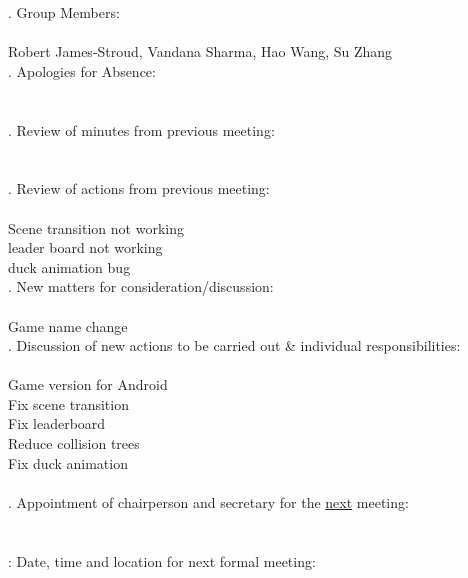 \documentclass{article}
\begin{document}
. Group Members: \\\\ \indent Robert James-Stroud, Vandana Sharma, Hao Wang, Su Zhang \\

. Apologies for Absence: \\\\ \indent   \\

. Review of minutes from previous meeting: \\\\ \indent  \\

. Review of actions from previous meeting: \\\\ \indent Scene transition not working \\ \indent leader board not working \\ \indent duck animation bug \\

. New matters for consideration/discussion: \\\\ \indent Game name change \\

. Discussion of new actions to be carried out \& individual responsibilities: \\\\ \indent Game version for Android \\ \indent Fix scene transition \\ \indent Fix leaderboard \\ \indent Reduce collision trees \\ \indent Fix duck animation \\\\

. Appointment of chairperson and secretary for the \underline{next} meeting: \\\\ \indent  \\

: Date, time and location for next formal meeting: \\\\ \indent  \\
\end{document}
